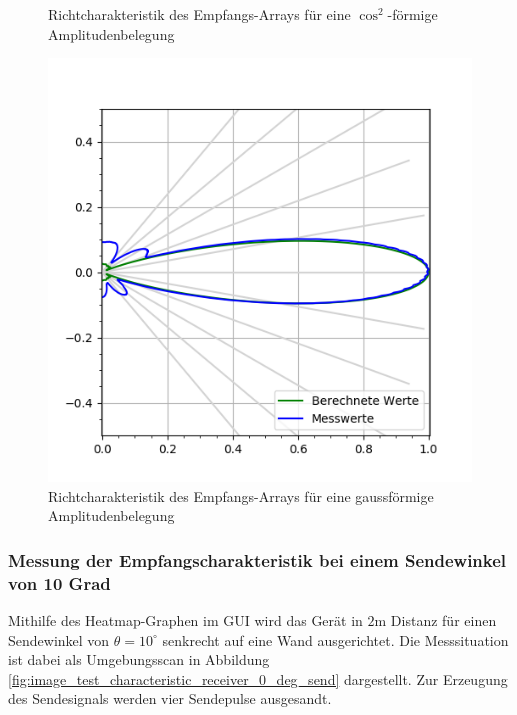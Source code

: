 \begin{figure}[htb]
\begin{minipage}{0.5\textwidth}
\caption{Richtcharakteristik des Empfangs-Arrays für eine $\cos^{2}$-förmige Amplitudenbelegung} %
\label{fig:plot_test_characteristic_receiver_0_deg_send_rect_receive_cos2_4_bursts}
%
\end{minipage}
\begin{minipage}{0.5\textwidth}
\includegraphics[width=\textwidth]{graphics/plot_test_characteristic_receiver_0_deg_send_rect_receive_gauss_4_bursts.png}
\caption{Richtcharakteristik des Empfangs-Arrays für eine gaussförmige Amplitudenbelegung} %
\label{fig:plot_test_characteristic_receiver_0_deg_send_rect_receive_gauss_4_bursts}
%
\end{minipage}
\end{figure}

\clearpage


\subsubsection{Messung der Empfangscharakteristik bei einem Sendewinkel von 10 Grad}
Mithilfe des Heatmap-Graphen im GUI wird das Gerät in $2 \mathrm{m}$ Distanz für einen Sendewinkel von $\theta = 10^{\circ}$ senkrecht auf eine Wand ausgerichtet. Die Messsituation ist dabei als Umgebungsscan in Abbildung \ref{fig:image_test_characteristic_receiver_0_deg_send} dargestellt. Zur Erzeugung des Sendesignals werden vier Sendepulse ausgesandt.

